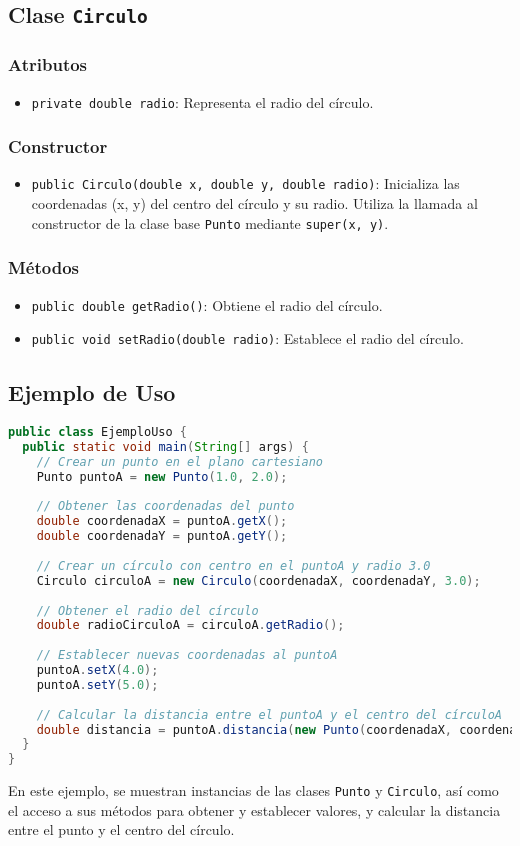 \subsection{Clase \texttt{Circulo}}
\subsubsection{Atributos}
\begin{itemize}
    \item \texttt{private double radio}: Representa el radio del círculo.
\end{itemize}

\subsubsection{Constructor}
\begin{itemize}
    \item \texttt{public Circulo(double x, double y, double radio)}: Inicializa las coordenadas (x, y) del centro del círculo y su radio. Utiliza la llamada al constructor de la clase base \texttt{Punto} mediante \texttt{super(x, y)}.
\end{itemize}

\subsubsection{Métodos}
\begin{itemize}
    \item \texttt{public double getRadio()}: Obtiene el radio del círculo.
    \item \texttt{public void setRadio(double radio)}: Establece el radio del círculo.
\end{itemize}

\subsection{Ejemplo de Uso}
\begin{lstlisting}[language=Java]
public class EjemploUso {
  public static void main(String[] args) {
    // Crear un punto en el plano cartesiano
    Punto puntoA = new Punto(1.0, 2.0);
    
    // Obtener las coordenadas del punto
    double coordenadaX = puntoA.getX();
    double coordenadaY = puntoA.getY();
    
    // Crear un círculo con centro en el puntoA y radio 3.0
    Circulo circuloA = new Circulo(coordenadaX, coordenadaY, 3.0);
    
    // Obtener el radio del círculo
    double radioCirculoA = circuloA.getRadio();
    
    // Establecer nuevas coordenadas al puntoA
    puntoA.setX(4.0);
    puntoA.setY(5.0);
    
    // Calcular la distancia entre el puntoA y el centro del círculoA
    double distancia = puntoA.distancia(new Punto(coordenadaX, coordenadaY));
  }
}
\end{lstlisting}

En este ejemplo, se muestran instancias de las clases \texttt{Punto} y \texttt{Circulo}, así como el acceso a sus métodos para obtener y establecer valores, y calcular la distancia entre el punto y el centro del círculo.
